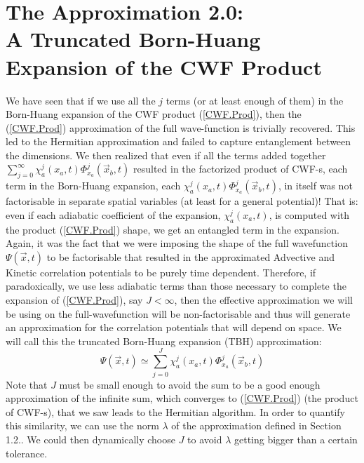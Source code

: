 \documentclass[11pt, a4paper]{article} %
\begin{document}
\section{The Approximation 2.0:\\ A Truncated Born-Huang Expansion of the CWF Product}
\vspace{-0.3cm}
We have seen that if we use all the $j$ terms (or at least enough of them) in the Born-Huang expansion of the CWF product (\ref{CWF.Prod}), then the (\ref{CWF.Prod}) approximation of the full wave-function is trivially recovered. This led to the Hermitian approximation and failed to capture entanglement between the dimensions. We then realized that even if all the terms added together $\sum_{j=0}^\infty \chi_a^j(x_a,t) \Phi_{x_a}^j(\vec{x}_b,t)$ resulted in the factorized product of CWF-s, each term in the Born-Huang expansion, each $\chi_a^j(x_a,t) \Phi_{x_a}^j(\vec{x}_b,t)$, in itself was not factorisable in separate spatial variables (at least for a general potential)! That is: even if each adiabatic coefficient of the expansion, $\chi_a^j(x_a,t)$, is computed with the product (\ref{CWF.Prod}) shape, we get an entangled term in the expansion. Again, it was the fact that we were imposing the shape of the full wavefunction $\Psi(\vec{x},t)$ to be factorisable that resulted in the approximated Advective and Kinetic correlation potentials to be purely time dependent. Therefore, if paradoxically, we use less adiabatic terms than those necessary to complete the expansion of (\ref{CWF.Prod}), say $J<\infty$, then the effective approximation we will be using on the full-wavefunction will be non-factorisable and thus will generate an approximation for the correlation potentials that will depend on space. We will call this the truncated Born-Huang expansion (TBH) approximation:\vspace{-0.3cm}
\begin{equation}\label{Aprox.Trunc}\tag{Aprox.Trunc}
\Psi(\vec{x},t)\simeq\sum_{j=0}^J \chi_a^j(x_a,t) \Phi_{x_a}^j(\vec{x}_b,t)
\end{equation}
Note that $J$ must be small enough to avoid the sum to be a good enough approximation of the infinite sum, which converges to (\ref{CWF.Prod}) (the product of CWF-s), that we saw leads to the Hermitian algorithm. In order to quantify this similarity, we can use the norm $\lambda$ of the approximation defined in Section 1.2.. We could then dynamically choose $J$ to avoid $\lambda$ getting bigger than a certain tolerance.
\end{document}
